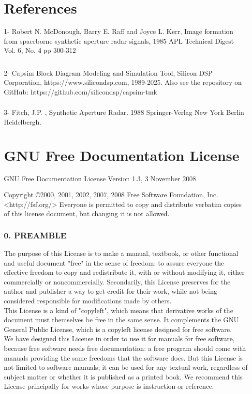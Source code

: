 \pagebreak
\chapter{References}

1- Robert N. McDonough, Barry E. Raff and Joyce L. Kerr, Image formation from spaceborne synthetic aperture radar signals, 1985 APL Technical Digest  Vol. 6, No. 4 pp 300-312
\subsection{  }
2- Capsim\textsuperscript{\textregistered} Block Diagram Modeling and Simulation Tool, Silicon DSP Corporation, https://www.silicondsp.com, 1989-2025. Also see the repository on GitHub: https://github.com/silicondsp/capsim-tmk
\subsection{  }
3- Fitch, J.P. , Synthetic Aperture Radar. 1988 Springer-Verlag New York Berlin Heidelbergh.





\pagebreak
\chapter{GNU Free Documentation License}
GNU Free Documentation License
Version 1.3, 3 November 2008
\par
\noindent
Copyright \copyright  2000, 2001, 2002, 2007, 2008 Free Software Foundation, Inc.  <http://fsf.org/>
Everyone is permitted to copy and distribute verbatim copies of this license document, but changing it is not allowed.

\subsection{0. PREAMBLE}


The purpose of this License is to make a manual, textbook, or other functional and useful document "free" in the sense of freedom: to assure everyone the effective freedom to copy and redistribute it, with or without modifying it, either commercially or noncommercially. Secondarily, this License preserves for the author and publisher a way to get credit for their work, while not being considered responsible for modifications made by others.\\
This License is a kind of "copyleft", which means that derivative works of the document must themselves be free in the same sense. It complements the GNU General Public License, which is a copyleft license designed for free software.\\
We have designed this License in order to use it for manuals for free software, because free software needs free documentation: a free program should come with manuals providing the same freedoms that the software does. But this License is not limited to software manuals; it can be used for any textual work, regardless of subject matter or whether it is published as a printed book. We recommend this License principally for works whose purpose is instruction or reference.\\
